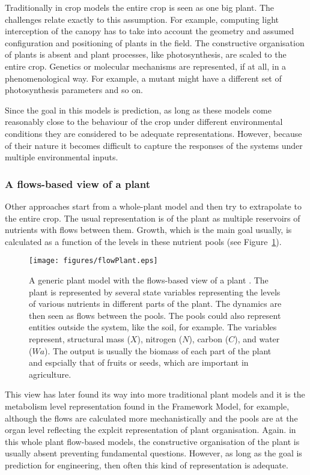 Traditionally in crop models the entire crop is seen as one big plant. The
challenges relate exactly to this assumption. For example, computing light
interception of the canopy has to take into account the geometry and assumed
configuration and positioning of plants in the field. The constructive
organisation of plants is absent and plant processes, like photosynthesis, are
scaled to the entire crop. Genetics or molecular mechanisms are represented, if
at all, in a phenomenological way. For example, a mutant might have a different
set of photosynthesis parameters and so on.

Since the goal in this models is prediction, as long as these models come
reasonably close to the behaviour of the crop under different environmental
conditions they are considered to be adequate representations. However, because
of their nature it becomes difficult to capture the responses of the systems
under multiple environmental inputs.

\subsubsection*{A flows-based view of a plant}
Other approaches start from a whole-plant model and then try to extrapolate to
the entire crop. The usual representation is of the plant as multiple reservoirs
of nutrients with flows between them. Growth, which is the main goal usually, is
calculated as a function of the levels in these nutrient pools (see
Figure~\ref{fig:plantFlow}).

\begin{figure}[tb]
\centering  
\texttt{[image: figures/flowPlant.eps]}
\caption{A generic plant model with the flows-based view of a plant
  \citep{france_mathematical_1984}. The plant is represented by several state
  variables representing the levels of various nutrients in different parts of
  the plant. The dynamics are then seen as flows between the pools. The pools
  could also represent entities outside the system, like the soil, for
  example. The variables represent, structural mass ($X$), nitrogen ($N$),
  carbon ($C$), and water ($Wa$). The output is usually the biomass of each part
  of the plant and espcially that of fruits or seeds, which are important in
  agriculture.}
  \label{fig:plantFlow}
\end{figure}

This view has later found its way into more traditional plant models and it is
the metabolism level representation found in the Framework Model, for example,
although the flows are calculated more mechanistically and the pools are at the
organ level reflecting the explcit representation of plant organisation. Again.
in this whole plant flow-based models, the constructive organisation of the
plant is usually absent preventing fundamental questions. However, as long as
the goal is prediction for engineering, then often this kind of representation
is adequate.


